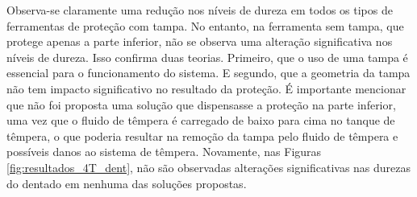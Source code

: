 Observa-se claramente uma redução nos níveis de dureza em todos os tipos de ferramentas de proteção com tampa. No entanto, na ferramenta sem tampa, que protege apenas a parte inferior, não se observa uma alteração significativa nos níveis de dureza. Isso confirma duas teorias. Primeiro, que o uso de uma tampa é essencial para o funcionamento do sistema. E segundo, que a geometria da tampa não tem impacto significativo no resultado da proteção. É importante mencionar que não foi proposta uma solução que dispensasse a proteção na parte inferior, uma vez que o fluido de têmpera é carregado de baixo para cima no tanque de têmpera, o que poderia resultar na remoção da tampa pelo fluido de têmpera e possíveis danos ao sistema de têmpera. Novamente, nas Figuras \ref{fig:resultados_4T_dent}, não são observadas alterações significativas nas durezas do dentado em nenhuma das soluções propostas.
